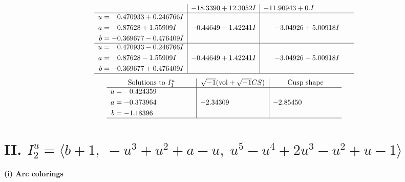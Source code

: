 \documentclass[1p]{elsarticle_modified}
\theoremstyle{definition}
\newcommand{\I}{\sqrt{-1}}
\begin{document}
$$\begin{array}{c|c|c}
 & -18.3390 + 12.3052 I & -11.90943 + 0. I\phantom{ +0.000000I} \\ \hline\begin{aligned}
u &= \phantom{-}0.470933 + 0.246766 I \\
a &= \phantom{-}0.87628 + 1.55909 I \\
b &= -0.369677 - 0.476409 I\end{aligned}
 & -0.44649 - 1.42241 I & -3.04926 + 5.00918 I \\ \hline\begin{aligned}
u &= \phantom{-}0.470933 - 0.246766 I \\
a &= \phantom{-}0.87628 - 1.55909 I \\
b &= -0.369677 + 0.476409 I\end{aligned}
 & -0.44649 + 1.42241 I & -3.04926 - 5.00918 I\\
 \hline 
 \end{array}$$\newpage$$\begin{array}{c|c|c}  
\text{Solutions to }I^u_{1}& \I (\text{vol} + \sqrt{-1}CS) & \text{Cusp shape}\\
 \hline 
\begin{aligned}
u &= -0.424359\phantom{ +0.000000I} \\
a &= -0.373964\phantom{ +0.000000I} \\
b &= -1.18396\phantom{ +0.000000I}\end{aligned}
 & -2.34309\phantom{ +0.000000I} & -2.85450\phantom{ +0.000000I}\\
 \hline 
 \end{array}$$\newpage\newpage\renewcommand{\arraystretch}{1}
\centering \section*{II. $I^u_{2}= \langle b+1,\;- u^3+u^2+a- u,\;u^5- u^4+2 u^3- u^2+u-1 \rangle$}
\flushleft \textbf{(i) Arc colorings}\\
\end{document}
